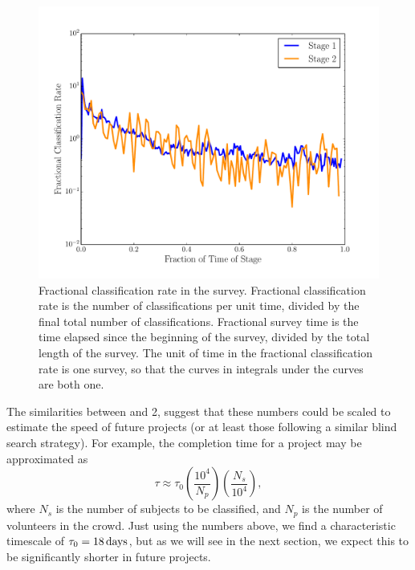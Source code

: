 \documentclass[useAMS,usenatbib,a4paper]{mn2e}
\begin{document}
\begin{figure}
\centering\includegraphics[width=\linewidth]{rate_classification.pdf}
\caption{Fractional classification rate in the \SW \cfhtls survey. Fractional classification rate is the number
of classifications per unit time, divided by the final total number of
classifications. Fractional survey time is the time elapsed since the beginning
of the survey, divided by the total length of the survey. The unit of time in
the fractional  classification rate is one survey, so that the curves in
integrals under the curves are both one. }
\label{fig:results:speed}
\end{figure}

The similarities between \StageOne and 2, suggest that these numbers could be
scaled to estimate the speed of future \SW projects (or at least those following
a similar blind search strategy). For example, the completion time for a \SW
project may be approximated as
\begin{equation}
    \tau \approx \tau_0 \left(\frac{10^4}{N_p}\right)
                               \left(\frac{N_s}{10^4}\right),
\label{eq:speed}
\end{equation}
where $N_s$ is the number of subjects to be classified, and $N_p$ is the number
of volunteers in the crowd. Just using the numbers above, we find a characteristic
timescale of $\tau_0 = 18\,{\rm days}$, but as we will see in the next section,
we expect this to be significantly shorter in future projects.
\end{document}
